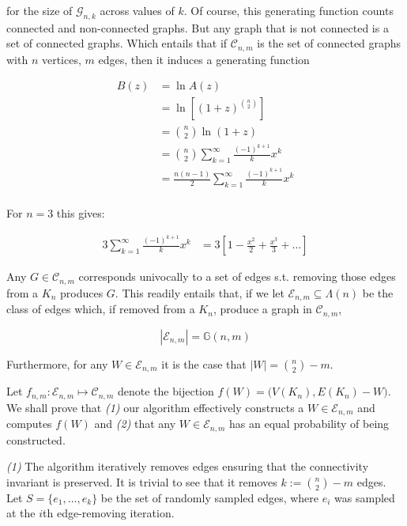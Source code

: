 \documentclass[a4paper, 12pt]{article}
\begin{document}
for the size of $\mathcal{G}_{n, k}$ across values of $k$. Of course, this generating 
function counts connected and non-connected graphs. But any graph that is 
not connected is a set of connected graphs. Which entails that if $\mathcal{C}_{n, m}$ 
is the set of connected graphs with $n$ vertices, $m$ edges, then it induces 
a generating function

\begin{align*}
    B(z) &= \ln A(z) \\ 
         &= \ln \left[ (1+z)^\binom{n}{2} \right]  \\ 
         &= \binom{n}{2} \ln(1 + z) \\ 
         &= \binom{n}{2} \sum_{k=1}^{\infty} \frac{ (-1)^{k+1} }{k}x^k \\ 
         &= \frac{n(n-1)}{2} \sum_{k=1}^{\infty} \frac{ (-1)^{k+1} }{k}x^k \\ 
\end{align*}

For $n = 3$ this gives: 

\begin{align*}
    3 \sum_{k=1}^{\infty} \frac{ (-1)^{k+1} }{k}x^k &= 3 \left[ 1 - \frac{x^2}{2} + \frac{x^3}{3} + \ldots \right] 
\end{align*}

\pagebreak 

Any $G \in \mathcal{C}_{n, m}$ corresponds univocally to a set of edges
s.t. removing those edges from a $K_n$ produces $G$. This readily entails that,
if we let $\mathcal{E}_{n, m} \subseteq \Lambda(n)$ be the class of edges which,
if removed from a $K_n$, produce a graph in $\mathcal{C}_{n, m}$,

$$
|\mathcal{E}_{n, m}| = \mathbb{G}(n, m)
$$

Furthermore, for any $W \in \mathcal{E}_{n, m}$ it is the case that $|W| =
\binom{n}{2} - m$. 

Let $f_{n,m} : \mathcal{E}_{n,m} \mapsto \mathcal{C}_{n, m}$ denote the
bijection $f(W) = \Big(V(K_n), E(K_n) - W\Big)$. We shall prove that
\textit{(1)} our algorithm effectively constructs a $W \in \mathcal{E}_{n,m}$
and computes $f(W)$ and \textit{(2)} that any $W \in \mathcal{E}_{n,m}$ has an
equal probability of being constructed.

\textit{(1)} The algorithm iteratively removes edges ensuring that the
connectivity invariant is preserved. It is trivial to see that it removes $k :=
\binom{n}{2} - m$ edges. Let $S = \{e_1, \ldots, e_{k}\}$ be the set of
randomly sampled edges, where $e_i$ was sampled at the $i$th edge-removing
iteration.
\end{document}
